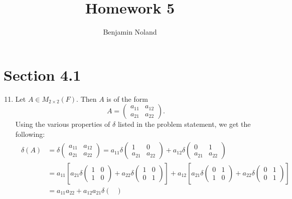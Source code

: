 \documentclass[12pt]{article}
\title{Homework 5}
\author{Benjamin Noland}
\date{}
\begin{document}
\maketitle

\section*{Section 4.1}

\begin{enumerate}
\setcounter{enumi}{10}
\item
Let $A \in M_{2 \times 2}(F)$. Then $A$ is of the form
\begin{equation*}
A =
\begin{pmatrix}
a_{11} & a_{12} \\
a_{21} & a_{22}
\end{pmatrix}.
\end{equation*}
Using the various properties of $\delta$ listed in the problem statement, we get the following:
\begin{align} \label{eq:1}
\begin{split}
\delta(A) &=
\delta \begin{pmatrix}
a_{11} & a_{12} \\
a_{21} & a_{22}
\end{pmatrix}
= a_{11} \delta \begin{pmatrix}
1 & 0 \\
a_{21} & a_{22}
\end{pmatrix}
+ a_{12} \delta \begin{pmatrix}
0 & 1 \\
a_{21} & a_{22}
\end{pmatrix} \\
&= a_{11} \left[
a_{21} \delta \begin{pmatrix}
1 & 0 \\
1 & 0
\end{pmatrix}
+ a_{22} \delta \begin{pmatrix}
1 & 0 \\
0 & 1
\end{pmatrix}
\right]
+ a_{12} \left[
a_{21} \delta \begin{pmatrix}
0 & 1 \\
1 & 0
\end{pmatrix}
+ a_{22} \delta \begin{pmatrix}
0 & 1 \\
0 & 1
\end{pmatrix}
\right] \\
&= a_{11}a_{22} + a_{12}a_{21} \delta \begin{pmatrix}

\end{pmatrix}
\end{split}
\end{align}
\end{enumerate}
\end{document}

